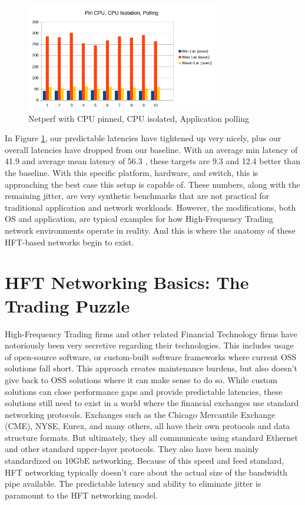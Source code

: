 \documentclass[letterpaper]{article}
\begin{document}
{{\begin{figure}[h]
\includegraphics[width=3.31in]{netperf-cpu-pin-cpu-isol-polling.png}
\caption{Netperf with CPU pinned, CPU isolated, Application polling}
\label{netperf-cpu-pin-cpu-isol-polling}
\end{figure}

In Figure \ref{netperf-cpu-pin-cpu-isol-polling}, our predictable latencies have tightened up very nicely, plus our overall latencies have dropped from our baseline.  With an average min latency of 41.9  and average mean latency of 56.3 , these targets are 9.3  and 12.4  better than the baseline. With this specific platform, hardware, and switch, this is approaching the best case this setup is capable of.
\newline
\newline
These numbers, along with the remaining jitter, are very synthetic benchmarks that are not practical for traditional application and network workloads.  However, the modifications, both OS and application, are typical examples for how High-Frequency Trading network environments operate in reality.  And this is where the anatomy of these HFT-based networks begin to exist.

\section{HFT Networking Basics: The Trading Puzzle}
High-Frequency Trading firms and other related Financial Technology firms have notoriously been very secretive regarding their technologies. This includes usage of open-source software, or custom-built software frameworks where current OSS solutions fall short.  This approach creates maintenance burdens, but also doesn't give back to OSS solutions where it can make sense to do so.
\newline
\newline
While custom solutions can close performance gaps and provide predictable latencies, these solutions still need to exist in a world where the financial exchanges use standard networking protocols.  Exchanges such as the Chicago Mercantile Exchange (CME), NYSE, Eurex, and many others, all have their own protocols and data structure formats.  But ultimately, they all communicate using standard Ethernet and other standard upper-layer protocols. They also have been mainly standardized on 10GbE networking. Because of this speed and feed standard, HFT networking typically doesn't care about the actual size of the bandwidth pipe available. The predictable latency and ability to eliminate jitter is paramount to the HFT networking model.

}}
\end{document}

